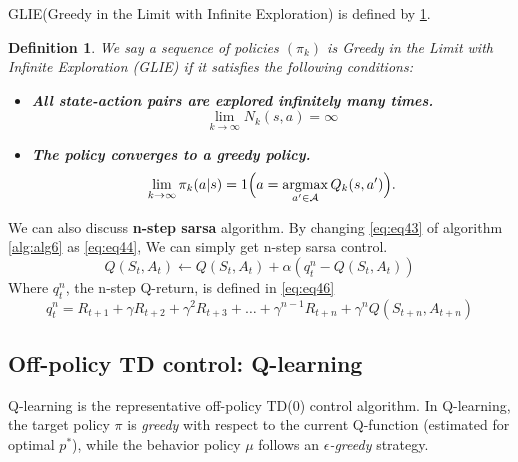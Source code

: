 \documentclass[
	10pt, %
]{article}
\newtheorem{definition}{Definition}[section]
\theoremstyle{plain}
\newcommand{\tb}[1]{\textbf{#1}}
\newcommand{\ti}[1]{\textit{#1}}
\numberwithin{equation}{subsection} %
\newcommand{\argmax}{\mathop{\mathrm{argmax}}\limits}
\begin{document}
GLIE(Greedy in the Limit with Infinite Exploration) is defined by \cref{def:def1}.

\begin{definition} \label{def:def1}
    We say a sequence of policies $(\pi_k)$ is \emph{Greedy in the Limit with Infinite Exploration (GLIE)} if it satisfies the following conditions:

\begin{itemize}
    \item \tb{All state-action pairs are explored infinitely many times.} 
    \[
        \lim_{k \to \infty} N_k(s, a) = \infty
    \]

    \item \tb{The policy converges to a greedy policy.}
    \[
        \lim_{k \to \infty} \pi_k(a|s)
        = 1\Bigl(a = \argmax_{a' \in \mathcal{A}} Q_k(s, a')\Bigr).
    \]
\end{itemize}
\end{definition}

We can also discuss \tb{n-step sarsa} algorithm. By changing \cref{eq:eq43} of algorithm \cref{alg:alg6} as \cref{eq:eq44}, We can simply get n-step sarsa control.
\begin{equation} \label{eq:eq44}
    Q(S_t,A_t) \gets Q(S_t,A_t) + \alpha (q^n_t - Q(S_t,A_t))
\end{equation}
Where $q^n_t$, the n-step Q-return, is defined in \cref{eq:eq46}
\begin{equation} \label{eq:eq46}
    q^n_t = R_{t+1} + \gamma R_{t+2}+ \gamma^2 R_{t+3} + \dots + \gamma^{n-1} R_{t+n} + \gamma^n Q(S_{t+n}, A_{t+n})
\end{equation}


\subsection{Off-policy TD control: Q-learning}
Q-learning is the representative off-policy TD(0) control algorithm. 
In Q-learning, the target policy $\pi$ is \ti{greedy} with respect to the current Q-function (estimated for optimal  $p^*$), while the behavior policy $\mu$ follows an \ti{$\epsilon$-greedy} strategy.
\end{document}
